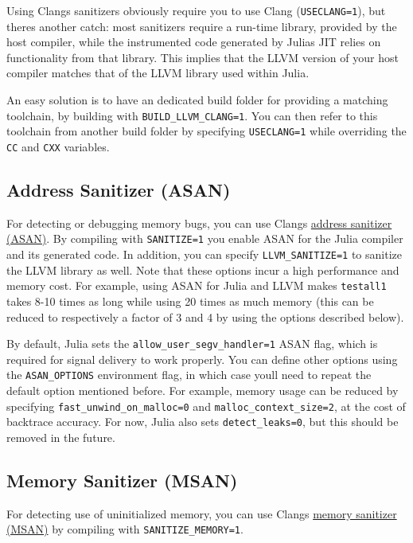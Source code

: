 Using Clang{\textquotesingle}s sanitizers obviously require you to use Clang (\texttt{USECLANG=1}), but there{\textquotesingle}s another catch: most sanitizers require a run-time library, provided by the host compiler, while the instrumented code generated by Julia{\textquotesingle}s JIT relies on functionality from that library. This implies that the LLVM version of your host compiler matches that of the LLVM library used within Julia.



An easy solution is to have an dedicated build folder for providing a matching toolchain, by building with \texttt{BUILD\_LLVM\_CLANG=1}. You can then refer to this toolchain from another build folder by specifying \texttt{USECLANG=1} while overriding the \texttt{CC} and \texttt{CXX} variables.



\hypertarget{1061650975116506198}{}


\subsection{Address Sanitizer (ASAN)}



For detecting or debugging memory bugs, you can use Clang{\textquotesingle}s \href{http://clang.llvm.org/docs/AddressSanitizer.html}{address sanitizer (ASAN)}. By compiling with \texttt{SANITIZE=1} you enable ASAN for the Julia compiler and its generated code. In addition, you can specify \texttt{LLVM\_SANITIZE=1} to sanitize the LLVM library as well. Note that these options incur a high performance and memory cost. For example, using ASAN for Julia and LLVM makes \texttt{testall1} takes 8-10 times as long while using 20 times as much memory (this can be reduced to respectively a factor of 3 and 4 by using the options described below).



By default, Julia sets the \texttt{allow\_user\_segv\_handler=1} ASAN flag, which is required for signal delivery to work properly. You can define other options using the \texttt{ASAN\_OPTIONS} environment flag, in which case you{\textquotesingle}ll need to repeat the default option mentioned before. For example, memory usage can be reduced by specifying \texttt{fast\_unwind\_on\_malloc=0} and \texttt{malloc\_context\_size=2}, at the cost of backtrace accuracy. For now, Julia also sets \texttt{detect\_leaks=0}, but this should be removed in the future.



\hypertarget{11752764117060042950}{}


\subsection{Memory Sanitizer (MSAN)}



For detecting use of uninitialized memory, you can use Clang{\textquotesingle}s \href{http://clang.llvm.org/docs/MemorySanitizer.html}{memory sanitizer (MSAN)} by compiling with \texttt{SANITIZE\_MEMORY=1}.



\hypertarget{8961334306702327363}{}
